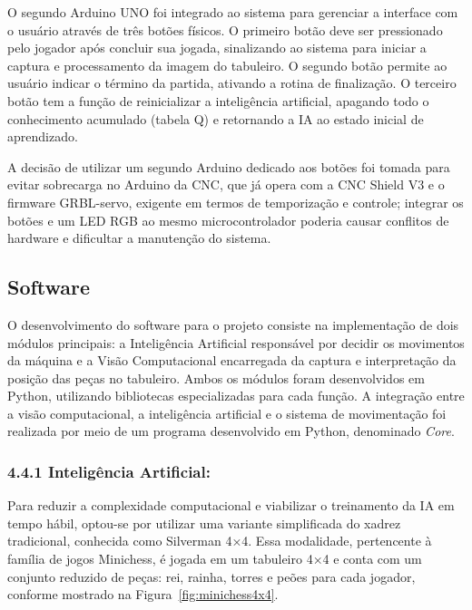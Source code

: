 \documentclass[a4paper]{ifacconf}
\begin{document}
\par\noindent O segundo Arduino UNO foi integrado ao sistema para gerenciar a interface com o usuário através de três botões físicos. O primeiro botão deve ser pressionado pelo jogador após concluir sua jogada, sinalizando ao sistema para iniciar a captura e processamento da imagem do tabuleiro. O segundo botão permite ao usuário indicar o término da partida, ativando a rotina de finalização. O terceiro botão tem a função de reinicializar a inteligência artificial, apagando todo o conhecimento acumulado (tabela Q) e retornando a IA ao estado inicial de aprendizado.

\par\noindent A decisão de utilizar um segundo Arduino dedicado aos botões foi tomada para evitar sobrecarga no Arduino da CNC, que já opera com a CNC Shield V3 e o firmware GRBL-servo, exigente em termos de temporização e controle; integrar os botões e um LED RGB ao mesmo microcontrolador poderia causar conflitos de hardware e dificultar a manutenção do sistema.

\subsection{Software}
\par\noindent O desenvolvimento do software para o projeto consiste na implementação de dois módulos principais: a Inteligência Artificial responsável por decidir os movimentos da máquina e a Visão Computacional encarregada da captura e interpretação da posição das peças no tabuleiro. Ambos os módulos foram desenvolvidos em Python, utilizando bibliotecas especializadas para cada função. A integração entre a visão computacional, a inteligência artificial e o sistema de movimentação foi realizada por meio de um programa desenvolvido em Python, denominado \textit{Core}. 

\subsubsection{4.4.1 Inteligência Artificial:}

\par\noindent Para reduzir a complexidade computacional e viabilizar o treinamento da IA em tempo hábil, optou-se por utilizar uma variante simplificada do xadrez tradicional, conhecida como Silverman 4×4. Essa modalidade, pertencente à família de jogos Minichess, é jogada em um tabuleiro 4×4 e conta com um conjunto reduzido de peças: rei, rainha, torres  e peões para cada jogador, conforme mostrado na Figura~\ref{fig:minichess4x4}.
\end{document}
